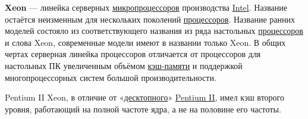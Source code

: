 \documentclass[a4paper,11pt]{article}
\begin{document}
\textbf{Xeon} — линейка серверных \href{https://ru.wikipedia.org/wiki/%D0%9C%D0%B8%D0%BA%D1%80%D0%BE%D0%BF%D1%80%D0%BE%D1%86%D0%B5%D1%81%D1%81%D0%BE%D1%80}{микропроцессоров} производства \href{https://ru.wikipedia.org/wiki/Intel}{Intel}. Название остаётся неизменным для нескольких поколений \href{https://ru.wikipedia.org/wiki/%D0%A6%D0%B5%D0%BD%D1%82%D1%80%D0%B0%D0%BB%D1%8C%D0%BD%D1%8B%D0%B9_%D0%BF%D1%80%D0%BE%D1%86%D0%B5%D1%81%D1%81%D0%BE%D1%80}{процессоров}. Название ранних моделей состояло из соответствующего названия из ряда настольных \href{https://ru.wikipedia.org/wiki/%D0%A6%D0%B5%D0%BD%D1%82%D1%80%D0%B0%D0%BB%D1%8C%D0%BD%D1%8B%D0%B9_%D0%BF%D1%80%D0%BE%D1%86%D0%B5%D1%81%D1%81%D0%BE%D1%80}{процессоров} и слова Xeon, современные модели имеют в названии только Xeon. В общих чертах серверная линейка процессоров отличается от процессоров для настольных ПК увеличенным объёмом \href{https://ru.wikipedia.org/wiki/%D0%9A%D0%B5%D1%88-%D0%BF%D0%B0%D0%BC%D1%8F%D1%82%D1%8C}{кэш-памяти} и поддержкой многопроцессорных систем большой производительности.

Pentium II Xeon, в отличие от «\href{https://ru.wikipedia.org/wiki/%D0%9D%D0%B0%D1%81%D1%82%D0%BE%D0%BB%D1%8C%D0%BD%D1%8B%D0%B9_%D0%BA%D0%BE%D0%BC%D0%BF%D1%8C%D1%8E%D1%82%D0%B5%D1%80}{десктопного}» \href{https://ru.wikipedia.org/wiki/Pentium_II}{Pentium II}, имел кэш второго уровня, работающий на полной частоте ядра, а не на половине его частоты.
\end{document}
